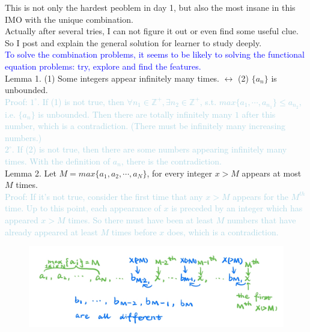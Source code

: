 \documentclass{Math_Note}
\begin{document}
\begin{sol}
This is not only the hardest peoblem in day 1, but also the most insane in this IMO with the unique combination. \\
Actually after several tries, I can not figure it out or even find some useful clue. So I post and explain the general solution for learner to study deeply. \\
\newline
\marginpar{\textcolor{green}{explore}}
\textcolor{blue}{
To solve the combination problems, it seems to be likely to solving the functional equation problems: 
try, explore and find the features. \\
}
\newline
Lemma 1. (1) Some integers appear infinitely many times. $\longleftrightarrow$ (2) $\{a_{n}\}$ is unbounded. \\
\textcolor{lightblue}{
Proof:  
$1^{\circ}.$ If (1) is not true, then $\forall n_{1}\in\mathbb{Z}^{+}, \exists n_{2}\in\mathbb{Z}^{+}$, s.t. $max\{a_{1},\cdots,a_{n_{1}}\}\leq a_{n_{2}}$, i.e. 
$\{a_{n}\}$ is unbounded. Then there are totally infinitely many $1$ after this number, which is a contradiction. (There must be infinitely many increasing numbers.) \\
$2^{\circ}.$ If (2) is not true, then there are some numbers appearing infinitely many times. With the definition of $a_{n}$, there is the contradiction. \\
}
Lemma 2. Let $M=max\{a_{1},a_{2},\cdots,a_{N}\}$, for every integer $x>M$ appears at most $M$ times. \\
\textcolor{lightblue}{
Proof:  
If it's not true, consider the first time that any $x>M$ appears for the $M^{th}$ time. Up to this point, each appearance of $x$ is preceded by an integer which has appeared $x>M$ times. 
So there must have been at least $M$ numbers that have already appeared at least $M$ times before $x$ does, which is a contradiction. \\
}
\begin{figure}[H]
    \centering
    \includegraphics[scale=0.25]{"./Figures/Q3F1.png"}

\end{figure}
\end{sol}
\end{document}
